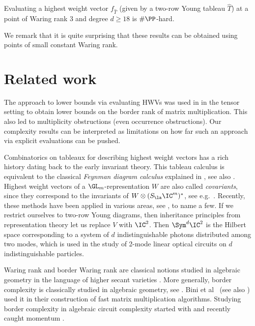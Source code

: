 \begin{theorem*thm:evaluationsharpphardness}[$\#\PP$-hardness]
    Evaluating a highest weight vector $f_{\hat{T}}$ (given by a two-row Young tableau $\hat{T}$) at a point of Waring rank $3$ and degree $d \geq 18$ is $\#\PP$-hard.
\end{theorem*thm:evaluationsharpphardness}
%
%
We remark that it is quite surprising that these results can be obtained using points of small constant Waring rank.

\section{Related work}
The approach to lower bounds via evaluating HWVs was used in \cite{BI:11, BI:13} in the tensor setting to obtain lower bounds on the border rank of matrix multiplication. This also led to multiplicity obstructions (even occurrence obstructions). Our complexity results can be interpreted as limitations on how far such an approach via explicit evaluations can be pushed.

Combinatorics on tableaux for describing highest weight vectors has a rich history dating back to the early invariant theory.
This tableau calculus is equivalent to the classical \emph{Feynman diagram calculus} explained in \cite{Abd:02}, see also \cite{Ott:13}. Highest weight vectors of a $\GL_m$-representation $W$ are also called \emph{covariants}, since they correspond to the invariants of $W \otimes (S_\la \IC^{m})^*$, see e.g.~\cite[Def.~3.9]{OR:11}.
Recently, these methods have been applied in various areas, see \cite{Kum:11, BO:11, Rai:13, DHO:14, MM:14, AIR:16,BI:17b, CHILO:18}, to name a few.
%
If we restrict ourselves to two-row Young diagrams, then inheritance principles from representation theory \cite[Sec.~5.3]{ike:12b} let us replace $V$ with $\IC^2$. Then $\Sym^d \IC^2$ is the
Hilbert space corresponding to a system of $d$ indistinguishable photons distributed among two modes, which is used in the study of 2-mode linear optical circuits on $d$ indistinguishable particles.


Waring rank and border Waring rank are classical notions studied in algebraic geometry in the language of higher secant varieties \cite{Lan:15}.
More generally, border complexity is classically studied in algebraic geometry, see \cite{Lan:11}. Bini et al~\cite{bcrl:79} (see also \cite{Bini:80}) used it in their construction of fast matrix multiplication algorithms.
Studying border complexity in algebraic circuit complexity started with \cite{bue:01, gct1} and recently caught momentum \cite{GMQ:16, BIZ:18, Kumar2018}.


